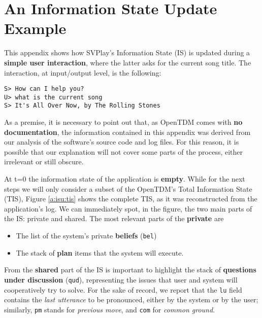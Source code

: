 
\chapter{An Information State Update Example} %

\label{a:isu} %


This appendix shows how SVPlay's Information State (IS) is updated during a \textbf{simple user interaction}, where the latter asks for the current song title. The interaction, at input/output level, is the following:
\begin{verbatim}
S> How can I help you?
U> what is the current song  
S> It's All Over Now, by The Rolling Stones
\end{verbatim}

As a premise, it is necessary to point out that, as OpenTDM comes with \textbf{no documentation}, the information contained in this appendix was derived from our analysis of the software's source code and log files. For this reason, it is possible that our explanation will not cover some parts of the process, either irrelevant or still obscure.

At t=0 the information state of the application is \textbf{empty}. While for the next steps we will only consider a subset of the OpenTDM's Total Information State (TIS), Figure \ref{a:isu:tis} shows the complete TIS, as it was reconstructed from the application's log. We can immediately spot, in the figure, the two main parts of the IS: private and shared. The most relevant parts of the \textbf{private} are
\begin{itemize}
	\item The list of the system's private \textbf{beliefs} (\texttt{bel})
	\item The stack of \textbf{plan} items that the system will execute.
\end{itemize}

From the \textbf{shared} part of the IS is important to highlight the stack of \textbf{questions under discussion} (\texttt{qud}), representing the issues that user and system will cooperatively try to solve. For the sake of record, we report that the \texttt{lu} field contains the \textit{last utterance} to be pronounced, either by the system or by the user; similarly, \texttt{pm} stands for \textit{previous move}, and \texttt{com} for \textit{common ground}.

